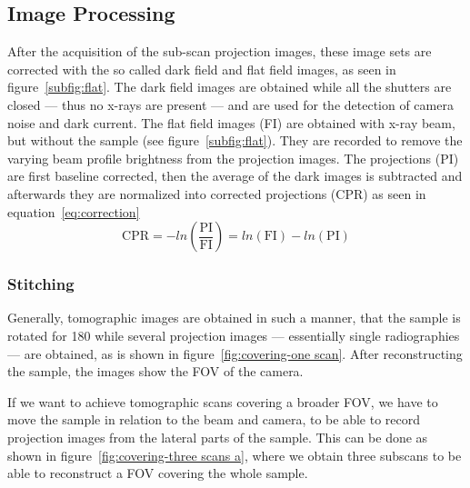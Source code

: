 \subsection{Image Processing}
\label{subsec:image processing}
After the acquisition of the sub-scan projection images, these image sets are corrected with the so called dark field and flat field images, as seen in figure~\ref{subfig:flat}. The dark field images are obtained while all the shutters are closed --- thus no x-rays are present --- and are used for the detection of camera noise and dark current. The flat field images (FI) are obtained with x-ray beam, but without the sample (see figure~\ref{subfig:flat}). They are recorded to remove the varying beam profile brightness from the projection images. The projections (PI) are first baseline corrected, then the average of the dark images is subtracted and afterwards they are normalized into corrected projections (CPR) as seen in equation~\ref{eq:correction}
\begin{equation}
\text{CPR}=-ln\left(\frac{\text{PI}}{\text{FI}}\right)=ln(\text{FI})-ln(\text{PI})
\label{eq:correction}
\end{equation}

\subsubsection{Stitching}
Generally, tomographic images are obtained in such a manner, that the sample is rotated for \unit{180}{\degree} while several projection images --- essentially single radiographies --- are obtained, as is shown in figure~\ref{fig:covering-one scan}. After reconstructing the sample, the images show the FOV of the camera.

\begin{figure*}[tb]
	\centering
	
	\caption{Covering the FOV -- one scan}
	\label{fig:covering-one scan}
\end{figure*}

If we want to achieve tomographic scans covering a broader FOV, we have to move the sample in relation to the beam and camera, to be able to record projection images from the lateral parts of the sample. This can be done as shown in figure~\ref{fig:covering-three scans a}, where we obtain three subscans to be able to reconstruct a FOV covering the whole sample.

\begin{figure*}[tb]
	\centering
	
	\caption{Covering the FOV -- three scans $\rightarrow$ sample has to move, explain that we still only do \unit{180}{\degree} scans!}
	\label{fig:covering-three scans a}
\end{figure*}

